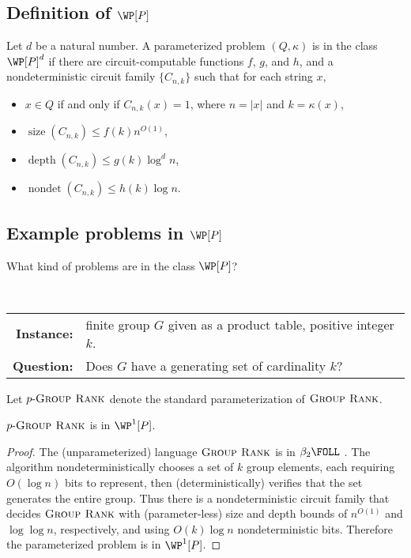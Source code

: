 \documentclass{article}
\newcommand{\dash}{\textnormal{-}}
\newcommand{\pgrouprank}{p\dash\textsc{Group Rank}}
\DeclareMathOperator{\depth}{depth}
\DeclareMathOperator{\nondet}{nondet}
\DeclareMathOperator{\size}{size}
\begin{document}
\subsection{Definition of \texorpdfstring{$\WP[P]$}{WP[P]}}

\begin{definition}[{$\WP^d[P]$}]
  Let $d$ be a natural number.
  A parameterized problem $(Q, \kappa)$ is in the class $\WP[P]^d$ if there are circuit-computable functions $f$, $g$, and $h$, and a nondeterministic circuit family $\{C_{n, k}\}$ such that for each string $x$,
  \begin{itemize}
  \item $x \in Q$ if and only if $C_{n, k}(x) = 1$, where $n = |x|$ and $k = \kappa(x)$,
  \item $\size(C_{n, k}) \leq f(k) n^{O(1)}$,
  \item $\depth(C_{n, k}) \leq g(k) \log^d n$,
  \item $\nondet(C_{n, k}) \leq h(k) \log n$.
  \end{itemize}
\end{definition}

\subsection{Example problems in \texorpdfstring{$\WP[P]$}{WP[P]}}
\label{sec:rankinwp}

What kind of problems are in the class $\WP[P]$?

\begin{definition}
  \mbox{} \\
  \begin{tabular}{r p{9.2cm}}
    \textbf{Instance:} & finite group $G$ given as a product table, positive integer $k$. \\
    \textbf{Question:} & Does $G$ have a generating set of cardinality $k$?
  \end{tabular}
\end{definition}

Let $\pgrouprank$ denote the standard parameterization of $\textsc{Group Rank}$.

\begin{theorem}
  $\pgrouprank$ is in $\WP^1[P]$.
\end{theorem}
\begin{proof}
  The (unparameterized) language $\textsc{Group Rank}$ is in $\beta_2 \FOLL$ \autocite[Theorem~4.2]{grouprank}.
  The algorithm nondeterministically chooses a set of $k$ group elements, each requiring $O(\log n)$ bits to represent, then (deterministically) verifies that the set generates the entire group.
  Thus there is a nondeterministic circuit family that decides $\textsc{Group Rank}$ with (parameter-less) size and depth bounds of $n^{O(1)}$ and $\log \log n$, respectively, and using $O(k) \log n$ nondeterministic bits.
  Therefore the parameterized problem is in $\WP^1[P]$.
\end{proof}
\end{document}
